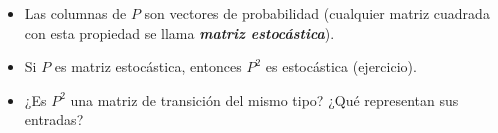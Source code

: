 {\begin{frame}
\begin{itemize}
		\vspace{5mm}
		\item Las columnas de $P$ son vectores de probabilidad (cualquier matriz cuadrada con esta propiedad se llama \textbf{\textit{matriz estocástica}}).
		
		\vspace{5mm}
		\item Si $P$ es matriz estocástica, entonces $P^2$ es estocástica (ejercicio).
		
		\vspace{5mm}
		\item ¿Es $P^2$ una matriz de transición del mismo tipo? ¿Qué representan sus entradas?
	\end{itemize}
	
\end{frame}
}


\subsection{}

